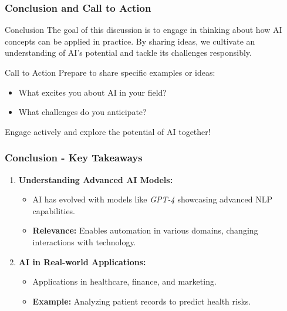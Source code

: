 \documentclass[aspectratio=169]{beamer}
\begin{document}
\begin{frame}[fragile]
    \frametitle{Conclusion and Call to Action}
    \begin{block}{Conclusion}
        The goal of this discussion is to engage in thinking about how AI concepts can be applied in practice. By sharing ideas, we cultivate an understanding of AI's potential and tackle its challenges responsibly.
    \end{block}
    
    \begin{block}{Call to Action}
        Prepare to share specific examples or ideas:
        \begin{itemize}
            \item What excites you about AI in your field?
            \item What challenges do you anticipate?
        \end{itemize}
        Engage actively and explore the potential of AI together!
    \end{block}
\end{frame}

\begin{frame}[fragile]
    \frametitle{Conclusion - Key Takeaways}
    \begin{enumerate}
        \item \textbf{Understanding Advanced AI Models:}
        \begin{itemize}
            \item AI has evolved with models like \textit{GPT-4} showcasing advanced NLP capabilities.
            \item \textbf{Relevance:} Enables automation in various domains, changing interactions with technology.
        \end{itemize}
        
        \item \textbf{AI in Real-world Applications:}
        \begin{itemize}
            \item Applications in healthcare, finance, and marketing.
            \item \textbf{Example:} Analyzing patient records to predict health risks.
        \end{itemize}
    \end{enumerate}
\end{frame}
\end{document}
